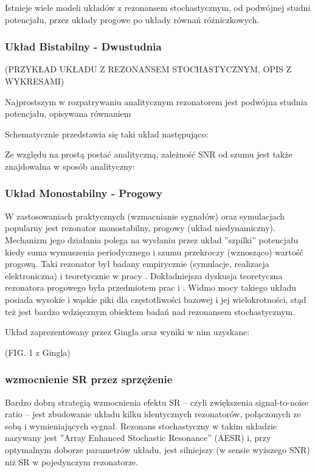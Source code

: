\documentclass[12pt]{article}
\begin{document}
  Istnieje wiele modeli układów z rezonansem stochastycznym, od podwójnej studni potencjału, przez układy progowe po układy równań różniczkowych.

  \subsubsection{Układ Bistabilny - Dwustudnia}

  (PRZYKŁAD UKŁADU Z REZONANSEM STOCHASTYCZNYM, OPIS Z WYKRESAMI)

  Najprostszym w rozpatrywaniu analitycznym rezonatorem jest podwójna studnia potencjału, opisywana równaniem


  Schematycznie przedstawia się taki układ następująco:

  Ze względu na prostą postać analityczną, zależność SNR od szumu jest także znajdowalna w sposób analityczny:



  \subsubsection{Układ Monostabilny - Progowy}

  W zastosowaniach praktycznych (wzmacnianie sygnałów) oraz symulacjach popularny jest rezonator monostabilny, progowy (układ niedynamiczny). Mechanizm jego działania polega na wysłaniu przez układ ''szpilki'' potencjału kiedy suma wymuszenia periodycznego i szumu przekroczy (wznosząco) wartość progową. Taki rezonator był badany empirycznie (symulacje, realizacja elektroniczna) i teoretycznie w pracy \cite{gingl_kiss_moss}. Dokładniejsza dyskusja teoretyczna rezonatora progowego była przedmiotem prac \cite{blondeau_e53} i \cite{blondeau_e55}. Widmo mocy takiego układu posiada wysokie i wąskie piki dla częstotliwości bazowej i jej wielokrotności, stąd też jest bardzo wdzięcznym obiektem badań nad rezonansem stochastycznym. 

  Układ zaprezentowany przez Gingla \cite{gingl_kiss_moss} oraz wyniki w nim uzyskane:

  (FIG. 1 z Gingla)

  \subsubsection{wzmocnienie SR przez sprzężenie}

  Bardzo dobrą strategią wzmocnienia efektu SR -- czyli zwiększenia signal-to-noise ratio -- jest zbudowanie układu kilku identycznych rezonatorów, połączonych ze sobą i wymieniających sygnał. Rezonans stochastyczny w takim układzie nazywany jest ''Array Enhanced Stochastic Resonance'' (AESR) \cite{lindner_meadows} i, przy optymalnym doborze parametrów układu, jest silniejszy (w sensie wyższego SNR) niż SR w pojedynczym rezonatorze.
\end{document}
